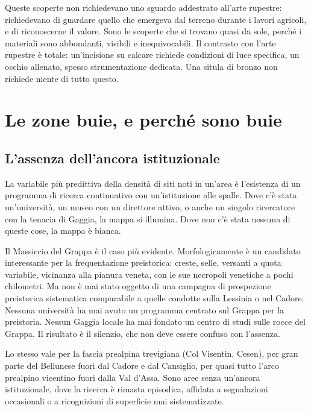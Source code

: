 Queste scoperte non richiedevano uno sguardo addestrato all'arte rupestre: richiedevano di guardare quello che emergeva dal terreno durante i lavori agricoli, e di riconoscerne il valore. Sono le scoperte che si trovano quasi da sole, perché i materiali sono abbondanti, visibili e inequivocabili. Il contrasto con l'arte rupestre è totale: un'incisione su calcare richiede condizioni di luce specifica, un occhio allenato, spesso strumentazione dedicata. Una situla di bronzo non richiede niente di tutto questo.

\section{Le zone buie, e perché sono buie}

\subsection{L'assenza dell'ancora istituzionale}

La variabile più predittiva della densità di siti noti in un'area è l'esistenza di un programma di ricerca continuativo con un'istituzione alle spalle. Dove c'è stata un'università, un museo con un direttore attivo, o anche un singolo ricercatore con la tenacia di Gaggia, la mappa si illumina. Dove non c'è stata nessuna di queste cose, la mappa è bianca.

Il Massiccio del Grappa è il caso più evidente. Morfologicamente è un candidato interessante per la frequentazione preistorica: creste, selle, versanti a quota variabile, vicinanza alla pianura veneta, con le sue necropoli venetiche a pochi chilometri. Ma non è mai stato oggetto di una campagna di prospezione preistorica sistematica comparabile a quelle condotte sulla Lessinia o nel Cadore. Nessuna università ha mai avuto un programma centrato sul Grappa per la preistoria. Nessun Gaggia locale ha mai fondato un centro di studi sulle rocce del Grappa. Il risultato è il silenzio, che non deve essere confuso con l'assenza.

Lo stesso vale per la fascia prealpina trevigiana (Col Visentin, Cesen), per gran parte del Bellunese fuori dal Cadore e dal Cansiglio, per quasi tutto l'arco prealpino vicentino fuori dalla Val d'Assa. Sono aree senza un'ancora istituzionale, dove la ricerca è rimasta episodica, affidata a segnalazioni occasionali o a ricognizioni di superficie mai sistematizzate.

